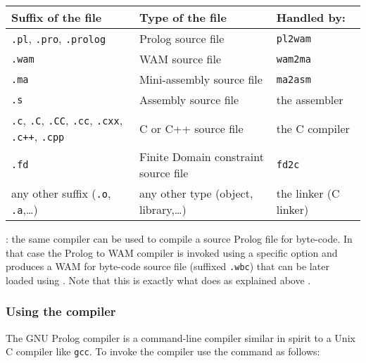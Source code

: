 \begin{tabular}{|l|l|l|}
\hline

Suffix of the file & Type of the file & Handled by: \\

\hline\hline

\texttt{.pl}, \texttt{.pro}, \texttt{.prolog} & Prolog source file & \texttt{pl2wam} \\

\hline

\texttt{.wam} & WAM source file & \texttt{wam2ma} \\

\hline

\texttt{.ma} & Mini-assembly source file & \texttt{ma2asm} \\

\hline

\texttt{.s} & Assembly source file & the assembler \\

\hline

\texttt{.c}, \texttt{.C}, \texttt{.CC}, \texttt{.cc}, \texttt{.cxx},
\texttt{.c++}, \texttt{.cpp} & C or C++ source file & the C compiler \\

\hline

\texttt{.fd} & Finite Domain constraint source file & \texttt{fd2c} \\

\hline

any other suffix (\texttt{.o}, \texttt{.a},\ldots) & any other type
(object, library,\ldots) & the linker (C linker) \\

\hline
\end{tabular}

: the same compiler can be used to compile a
source Prolog file for byte-code. In that case the Prolog to WAM compiler is
invoked using a specific option and produces a WAM for byte-code source file
(suffixed \texttt{.wbc}) that can be later loaded using 
. Note that this is exactly what 
 does as explained above .

\subsubsection{Using the compiler}
\label{Using-the-compiler}
The GNU Prolog compiler is a command-line compiler similar in spirit to a Unix
C compiler like \texttt{gcc}. To invoke the compiler use the 
command as follows:

